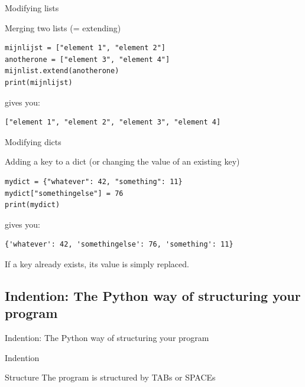 \begin{frame}[fragile]{Modifying lists}
\begin{block}{Merging two lists (= extending)}
\begin{lstlisting}
mijnlijst = ["element 1", "element 2"]
anotherone = ["element 3", "element 4"]
mijnlist.extend(anotherone)
print(mijnlijst)
\end{lstlisting}
gives you:
\begin{lstlisting}
["element 1", "element 2", "element 3", "element 4]
\end{lstlisting}
\end{block}
\end{frame}




\begin{frame}[fragile]{Modifying dicts}
\begin{block}{Adding a key to a dict (or changing the value of an existing key)}
\begin{lstlisting}
mydict = {"whatever": 42, "something": 11}
mydict["somethingelse"] = 76
print(mydict)
\end{lstlisting}
gives you:
\begin{lstlisting}
{'whatever': 42, 'somethingelse': 76, 'something': 11}
\end{lstlisting}
If a key already exists, its value is simply replaced.
\end{block}
\end{frame}




\subsection*[Indention]{Indention: The Python way of structuring your program}
\begin{frame}[plain]
Indention: The Python way of structuring your program
\end{frame}


\begin{frame}[fragile]{Indention}
\begin{block}{Structure}
The program is structured by TABs or SPACEs
\end{block}

\end{frame}



